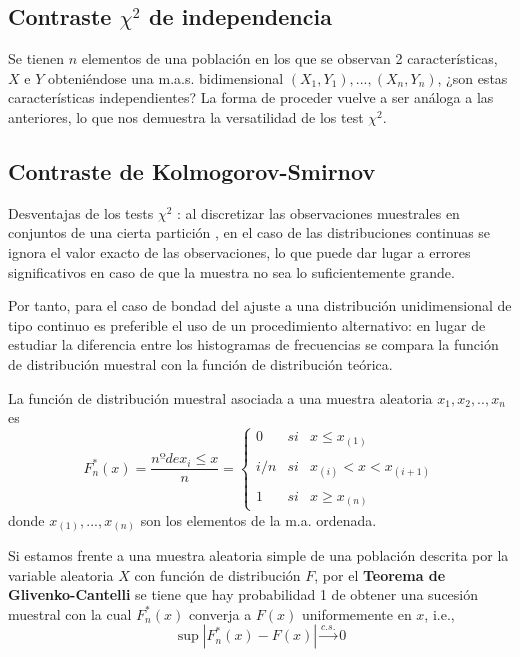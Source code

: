 \documentclass[a4paper,12pt]{article}
\begin{document}
\subsection{Contraste $\chi^2$ de independencia}
Se tienen $n$ elementos de una población en los que se observan 2 características, $X$ e $Y$ obteniéndose una m.a.s. bidimensional $(X_1,Y_1),...,(X_n,Y_n)$, ¿son estas características independientes? La forma de proceder vuelve a ser análoga a las anteriores, lo que nos demuestra la versatilidad de los test $\chi^2$.

\subsection{Contraste de Kolmogorov-Smirnov }
Desventajas de los tests $\chi^2$ : al discretizar las observaciones muestrales en conjuntos de una cierta partición , en el caso de las distribuciones continuas se ignora el valor exacto de las observaciones, lo que puede dar lugar a errores significativos en caso de que la muestra no sea lo suficientemente grande.

Por tanto, para el caso de bondad del ajuste a una distribución unidimensional de tipo continuo es preferible el uso de un procedimiento alternativo: en lugar de estudiar la diferencia entre los histogramas de frecuencias se compara la función de distribución muestral con la función de distribución teórica.

La función de distribución muestral asociada a  una muestra aleatoria $x_1, x_2,..,x_n$ es 
$$F^*_n(x) = \frac{nº de x_i \leq x}{n} = \left\{ \begin{array}{lcc}
             0 &   si  & x \leq x_{(1)} \\
             \\ i/n &  si & x_{(i)} < x < x_{(i+1)} \\
             \\ 1 &  si  & x \geq x_{(n)}
             \end{array}
   \right. $$
donde $x_{(1)},...,x_{(n)}$ son los elementos de la m.a. ordenada.

Si estamos frente a una muestra aleatoria simple de una población descrita por la variable aleatoria $X$ con función de distribución $F$, por el \textbf{Teorema de Glivenko-Cantelli} se tiene que hay probabilidad 1 de obtener una sucesión muestral con la cual $F^*_n(x)$ converja a $F(x)$ uniformemente en $x$, i.e.,
$$\sup |F^*_n(x) - F(x)| \xrightarrow{c.s.} 0$$
\end{document}
